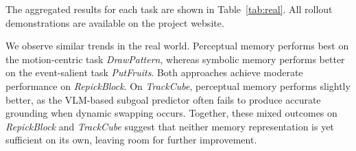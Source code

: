 The aggregated results for each task are shown in Table~\ref{tab:real}. All rollout demonstrations are available on the project website.

We observe similar trends in the real world. Perceptual memory performs best on the motion-centric task \textit{DrawPattern}, whereas symbolic memory performs better on the event-salient task \textit{PutFruits}. Both approaches achieve moderate performance on \textit{RepickBlock}. On \textit{TrackCube}, perceptual memory performs slightly better, as the VLM-based subgoal predictor often fails to produce accurate grounding when dynamic swapping occurs. Together, these mixed outcomes on \textit{RepickBlock} and \textit{TrackCube} suggest that neither memory representation is yet sufficient on its own, leaving room for further improvement.
